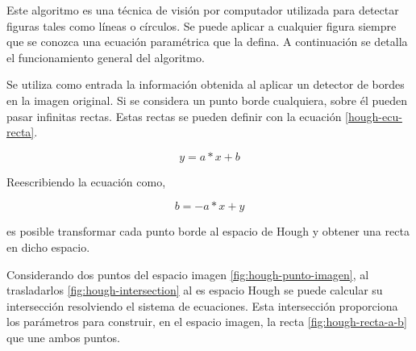 Este algoritmo es una técnica de visión por computador utilizada para detectar figuras tales como líneas o círculos. Se puede aplicar a cualquier figura siempre que se conozca una ecuación paramétrica que la defina. A continuación se detalla el funcionamiento general del algoritmo.

Se utiliza como entrada la información obtenida al aplicar un detector de bordes en la imagen original. Si se considera un punto borde cualquiera, sobre él pueden pasar infinitas rectas. Estas rectas se pueden definir con la ecuación \ref{hough-ecu-recta}.

\begin{equation}
    \label{hough-ecu-recta}
    y = a*x + b
\end{equation}

Reescribiendo la ecuación como,

\begin{equation}
b = -a*x + y
\end{equation}

es posible transformar cada punto borde al espacio de Hough y obtener una recta en dicho espacio.

Considerando dos puntos del espacio imagen \ref{fig:hough-punto-imagen}, al trasladarlos \ref{fig:hough-intersection} al es espacio Hough se puede calcular su intersección resolviendo el sistema de ecuaciones. Esta intersección proporciona los parámetros para construir, en el espacio imagen, la recta \ref{fig:hough-recta-a-b} que une ambos puntos.

